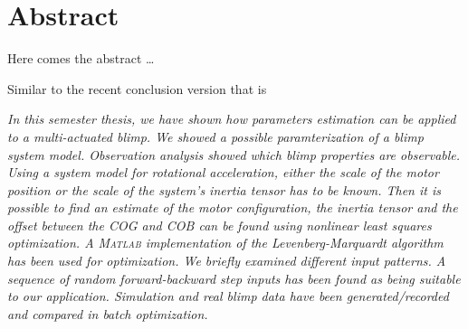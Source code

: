 \chapter*{Abstract}

Here comes the abstract \dots

Similar to the recent conclusion version that is

\textit{
In this semester thesis, we have shown how parameters estimation can be applied to a multi-actuated blimp.
We showed a possible paramterization of a blimp system model.
Observation analysis showed which blimp properties are observable.
Using a system model for rotational acceleration, either the scale of the motor position or the scale of the system's inertia tensor has to be known.
Then it is possible to find an estimate of the motor configuration, the inertia tensor and the offset between the COG and COB can be found using nonlinear least squares optimization.
A \textsc{Matlab} implementation of the Levenberg-Marquardt algorithm has been used for optimization.
We briefly examined different input patterns.
A sequence of random forward-backward step inputs has been found as being suitable to our application.
Simulation and real blimp data have been generated/recorded and compared in batch optimization.
}